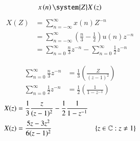 \documentclass[journal,12pt,twocolumn]{IEEEtran}
\theoremstyle{remark}
\begin{document}
\begin{align}
x \brak{n} \system{Z} X \brak{z} 
\end{align}
\begin{align}
X(Z) &= \sum_{n = -\infty}^{\infty} x(n) Z^{-n} \\
 &= \sum_{n = -\infty}^{\infty} (\frac{n}{3} - \frac{1}{2})  u(n)  z^{-n} \\
 &= \sum_{n=0}^{\infty} \frac{n}{3}  z^{-n} - \sum_{n=0}^{\infty} \frac{1}{2}  z^{-n} 
\end{align}

\begin{align} \sum_{n=0}^{\infty} \frac{n}{3}  z^{-n} &= \frac{1}{3}  \left(\frac{Z}{(z-1)^{2}}\right) \\
\sum_{n=0}^{\infty} \frac{1}{2}  z^{-n} &=  \frac{1}{2}  \left(\frac{1}{1- z^{-1}}\right) 
\end{align}
\begin{align}
X(z) &= \frac{1}{3}  \frac{z}{(z-1)^{2}} - \frac{1}{2}  \frac{1}{1-z^{-1}} \\
X(z) &= {\frac{5z-3 z^{2}}{6(z-1)^{2}}}&\left\{z\in\mathbb{C} : z \neq 1\right\} 
\end{align}

\end{document}

